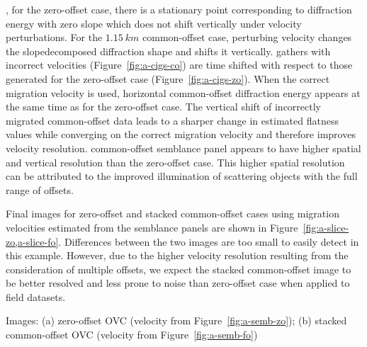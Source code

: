 , for the zero-offset case, there is a stationary
point corresponding to diffraction energy with zero slope which does not shift vertically under velocity
perturbations. For the $1.15\ km$ common-offset case, perturbing velocity changes the slope\old{-}\new{ }decomposed diffraction shape and shifts it vertically.
 gathers with incorrect velocities (Figure~\ref{fig:a-cigs-co})
are time shifted with respect to those generated for the zero-offset case (Figure~\ref{fig:a-cigs-zo}). When the correct migration
velocity is used, horizontal common-offset diffraction energy appears at the same time as for the zero-offset case. 
The vertical shift of incorrectly migrated common-offset data leads to a sharper change in estimated flatness values while converging on the correct migration velocity and therefore improves velocity resolution.
 common-offset semblance panel appears to have higher spatial and vertical resolution than the zero-offset case.
This higher spatial resolution can be attributed to the improved illumination of scattering
objects with the full range of offsets.

Final images for zero-offset and stacked common-offset cases using migration velocities estimated from the semblance panels
are shown in Figure~\ref{fig:a-slice-zo,a-slice-fo}.
Differences between the two images are too small to easily detect in this example.
However, due to the higher velocity resolution resulting from the consideration of multiple offsets,
we expect the stacked common-offset image to be better resolved and less prone to noise than zero-offset case when applied to field datasets. 



{Images: (a) zero-offset OVC (velocity from Figure~\ref{fig:a-semb-zo}); (b) stacked common-offset OVC (velocity from Figure~\ref{fig:a-semb-fo})}


